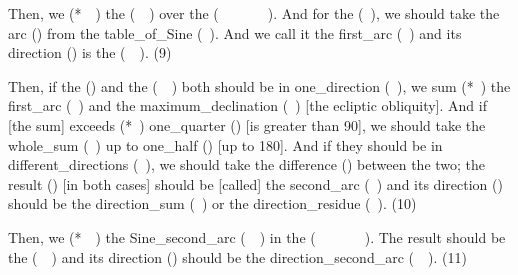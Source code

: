 Then, we  (*\munhatt\idafaconsonant\ \qismat\ \kardan) the  (\jayb\idafaconsonant\ \ard\idafaconsonant\ \kawkab) over the  (\jayb\idafaconsonant\ \tamam\idafaconsonant\ \bud\ \az\ \guillemotleft\dayiri\idafavowel\ \marri\ \biaqtab\idafaconsonant\ \arbai\guillemotright). And for the  (\kharij\idafaconsonant\ \qismat), we should take the \gls{arc} (\qaws) from the \gls{table_of_Sine} (\jadval\idafaconsonant\ \jayb). And we call it the \gls{first_arc} (\qaws\idafaconsonant\ \avval) and its \gls{direction} (\jahat) is the  (\jahat\idafaconsonant\ \ard\idafaconsonant\ \kawkab). (9)


Then, if the  (\ard) and the  (\mayl\idafaconsonant\ \daraji\idafavowel\ \kawkab) both should be in \gls{one_direction} (\yik\ \jahat), we \gls{sum} (*\jam\ \kardan) the \gls{first_arc} (\qaws\idafaconsonant\ \avval) and the \gls{maximum_declination} (\mayl\idafaconsonant\ \kulli) [\ie the ecliptic obliquity]. And if [the sum] \gls{exceeds} (*\ziyadi\ \shudan) \gls{one_quarter} (\rabi) [\ie is greater than 90\degree], we should take the \gls{whole_sum} (\tamam\idafaconsonant\ \majmu) up to \gls{one_half} (\nisf) [\ie up to 180\degree]. And if they should be in \gls{different_directions} (\jahat\idafaconsonant\ \mukhtalif), we should take the \gls{difference} (\tafadul) between the two; the \gls{result} (\hasil) [in both cases] should be [called] 
the \gls{second_arc} (\qaws\idafaconsonant\ \duvum) and its \gls{direction} (\jahat) should be the \gls{direction_sum} (\jahat\idafaconsonant\ \majmu) or the \gls{direction_residue} (\jahat\idafaconsonant\ \fadla). (10)

Then, we  (*\munhatt\idafaconsonant\ \darb\ \kardan) the \gls{Sine_second_arc} (\jayb\idafaconsonant\ \qaws\idafaconsonant\ \duvum) in the  (\jayb\idafaconsonant\ \tamam\idafaconsonant\ \bud\ \az\ \guillemotleft\dayiri\idafavowel\ \marri\ \biaqtab\idafaconsonant\ \arbai\guillemotright). The result should be the  (\jayb\idafaconsonant\ \bud\idafaconsonant\ \kawkab) and its \gls{direction} (\jahat) should be the \gls{direction_second_arc}  (\jahat\idafaconsonant\ \qaws\idafaconsonant\ \duvum). (11)
